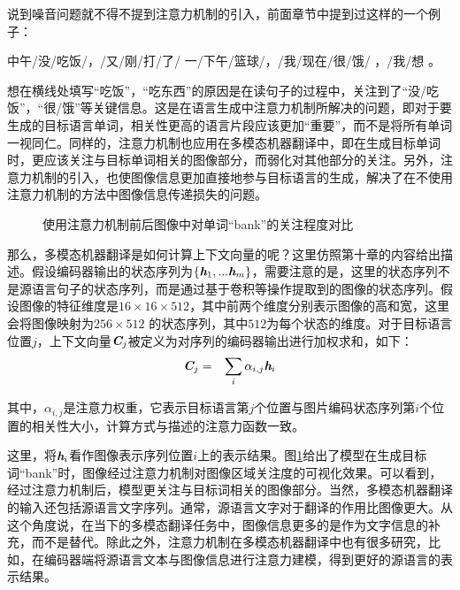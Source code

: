 \parinterval 说到噪音问题就不得不提到注意力机制的引入，前面章节中提到过这样的一个例子：

\vspace{0.8em}
\centerline{中午/没/吃饭/，/又/刚/打/了/ 一/下午/篮球/，/我/现在/很/饿/ ，/我/想\underline{\quad \quad} 。}
\vspace{0.8em}

\parinterval 想在横线处填写“吃饭”，“吃东西”的原因是在读句子的过程中，关注到了“没/吃饭”，“很/饿”等关键信息。这是在语言生成中注意力机制所解决的问题，即对于要生成的目标语言单词，相关性更高的语言片段应该更加“重要”，而不是将所有单词一视同仁。同样的，注意力机制也应用在多模态机器翻译中，即在生成目标单词时，更应该关注与目标单词相关的图像部分，而弱化对其他部分的关注。另外，注意力机制的引入，也使图像信息更加直接地参与目标语言的生成，解决了在不使用注意力机制的方法中图像信息传递损失的问题。

\begin{figure}[htp]
\centering

\caption{使用注意力机制前后图像中对单词“bank”的关注程度对比}
\label{tab:17-2-3-c}
\end{figure}

\parinterval 那么，多模态机器翻译是如何计算上下文向量的呢？这里仿照第十章的内容给出描述。假设编码器输出的状态序列为$\{\textbf{\em h}_1,...\textbf{\em h}_m\}$，需要注意的是，这里的状态序列不是源语言句子的状态序列，而是通过基于卷积等操作提取到的图像的状态序列。假设图像的特征维度是$16 \times 16 \times 512$，其中前两个维度分别表示图像的高和宽，这里会将图像映射为$256 \times 512$ 的状态序列，其中$512$为每个状态的维度。对于目标语言位置$j$，上下文向量$\textbf{\em C}_{j}$被定义为对序列的编码器输出进行加权求和，如下：
\begin{eqnarray}
\textbf{\em C}_{j}&=& \sum_{i}{{\alpha}_{i,j}{\textbf{\em h}}_{i}}
\end{eqnarray}

\noindent 其中，${\alpha}_{i,j}$是注意力权重，它表示目标语言第$j$个位置与图片编码状态序列第$i$个位置的相关性大小，计算方式与{\chapterten}描述的注意力函数一致。

\parinterval 这里，将$\textbf{\em h}_{i}$看作图像表示序列位置$i$上的表示结果。图\ref{tab:17-2-3-c}给出了模型在生成目标词“bank”时，图像经过注意力机制对图像区域关注度的可视化效果。可以看到，经过注意力机制后，模型更关注与目标词相关的图像部分。当然，多模态机器翻译的输入还包括源语言文字序列。通常，源语言文字对于翻译的作用比图像更大。从这个角度说，在当下的多模态翻译任务中，图像信息更多的是作为文字信息的补充，而不是替代。除此之外，注意力机制在多模态机器翻译中也有很多研究，比如，在编码器端将源语言文本与图像信息进行注意力建模，得到更好的源语言的表示结果。

